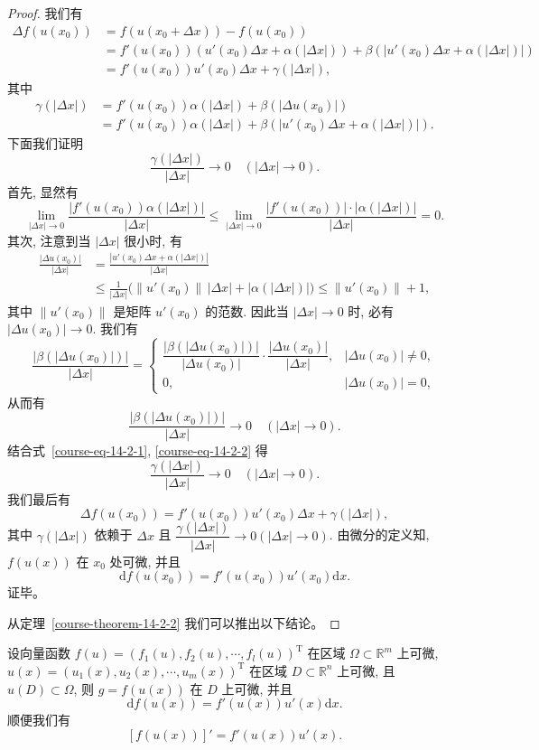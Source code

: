 \documentclass[12pt,fontset=fandol]{ctexart}
\begin{document}
\begin{proof}
我们有
\[
\begin{aligned}
  \Delta f(u(x_0))
  &=f(u(x_0+\Delta x))-f(u(x_0))\\
  &=f'(u(x_0))(u'(x_0)\Delta x+\alpha(|\Delta x|))
  +\beta(|u'(x_0)\Delta x+\alpha(|\Delta x|)|)\\
  &=f'(u(x_0))u'(x_0)\Delta x+\gamma(|\Delta x|),
\end{aligned}
\]
其中
\[
\begin{aligned}
  \gamma(|\Delta x|)
  &=f'(u(x_0))\alpha(|\Delta x|)
  +\beta(|\Delta u(x_0)|)\\
  &=f'(u(x_0))\alpha(|\Delta x|)
  +\beta(|u'(x_0)\Delta x+\alpha(|\Delta x|)|).
\end{aligned}
\]
下面我们证明
\[
  \frac{\gamma(|\Delta x|)}{|\Delta x|}\to0\quad(|\Delta x|\to0).
\]
首先, 显然有
\begin{equation}
  \lim_{|\Delta x|\to0}
  \frac{|f'(u(x_0))\alpha(|\Delta x|)|}{|\Delta x|}
  \leqslant
  \lim_{|\Delta x|\to0}
  \frac{|f'(u(x_0))|\cdot|\alpha(|\Delta x|)|}{|\Delta x|}=0.
\label{course-eq-14-2-1}
\end{equation}
其次, 注意到当 $|\Delta x|$ 很小时, 有
\[
\begin{aligned}
  \frac{|\Delta u(x_0)|}{|\Delta x|}
  &=\frac{|u'(x_0)\Delta x+\alpha(|\Delta x|)|}{|\Delta x|}\\
  &\leqslant \frac1{|\Delta x|}\bigl(\|u'(x_0)\|\,|\Delta x|+|\alpha(|\Delta x|)|\bigr)
  \leqslant \|u'(x_0)\|+1,
\end{aligned}
\]
其中 $\|u'(x_0)\|$ 是矩阵 $u'(x_0)$ 的范数. 因此当 $|\Delta x|\to0$ 时, 必有 $|\Delta u(x_0)|\to0$. 我们有
\[
  \frac{|\beta(|\Delta u(x_0)|)|}{|\Delta x|}
  =
  \begin{cases}
    \dfrac{|\beta(|\Delta u(x_0)|)|}{|\Delta u(x_0)|}
    \cdot\dfrac{|\Delta u(x_0)|}{|\Delta x|}, &|\Delta u(x_0)|\ne0,\\[1.2em]
    0, &|\Delta u(x_0)|=0,
  \end{cases}
\]
从而有
\begin{equation}
  \frac{|\beta(|\Delta u(x_0)|)|}{|\Delta x|}\to0
  \quad(|\Delta x|\to0).
\label{course-eq-14-2-2}
\end{equation}
结合式~\eqref{course-eq-14-2-1}, \eqref{course-eq-14-2-2}  得
\[
  \frac{\gamma(|\Delta x|)}{|\Delta x|}\to0\quad(|\Delta x|\to0).
\]
我们最后有
\[
  \Delta f(u(x_0))=f'(u(x_0))u'(x_0)\Delta x+\gamma(|\Delta x|),
\]
其中 $\gamma(|\Delta x|)$ 依赖于 $\Delta x$ 且 $\dfrac{\gamma(|\Delta x|)}{|\Delta x|}\to0(|\Delta x|\to0)$. 由微分的定义知, $f(u(x))$ 在 $x_0$ 处可微, 并且
\[
  \mathrm df(u(x_0))=f'(u(x_0))u'(x_0)\mathrm dx.
\]
证毕。

从定理~\ref{course-theorem-14-2-2}  我们可以推出以下结论。

\end{proof}
\noindent{}\quad 设向量函数 $f(u)=(f_1(u),f_2(u),\cdots,f_l(u))^\mathrm T$ 在区域 $\Omega\subset\mathbb R^m$ 上可微, $u(x)=(u_1(x),u_2(x),\cdots,u_m(x))^\mathrm T$ 在区域 $D\subset\mathbb R^n$ 上可微, 且 $u(D)\subset\Omega$, 则 $g=f(u(x))$ 在 $D$ 上可微, 并且
\[
  \mathrm df(u(x))=f'(u(x))u'(x)\mathrm dx.
\]
顺便我们有
\[
  [f(u(x))]'=f'(u(x))u'(x).
\]
\end{document}

